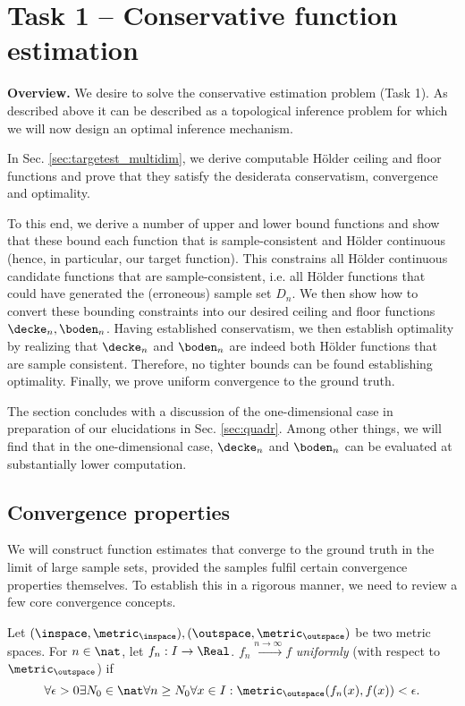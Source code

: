 
\section{Task 1 -- Conservative function estimation }
\label{sec:Hfe}
\textbf{Overview.} We desire to solve the conservative estimation problem (Task 1). As described above it can be described as a topological inference problem for which we will now design an optimal inference mechanism.  

In Sec. \ref{sec:targetest_multidim}, we derive computable H\"older ceiling and floor functions and prove that they satisfy the desiderata conservatism, convergence and optimality.  

To this end, we derive a number of upper and lower bound functions and show that these bound each function that is sample-consistent and H\"older continuous (hence, in particular, our target function). This constrains all H\"older continuous candidate functions that are sample-consistent, i.e. all H\"older functions that could have generated the (erroneous) sample set $D_n$. We then show how to convert these bounding constraints into our desired ceiling and floor functions $\decke_n, \boden_n$. Having established conservatism, we then establish optimality by realizing that $\decke_n$ and $\boden_n$ are indeed both H\"older functions that are sample consistent. Therefore, no tighter bounds can be found establishing optimality. Finally, we prove uniform convergence to the ground truth.

The section concludes with a discussion of the one-dimensional case in preparation of our elucidations in Sec. \ref{sec:quadr}. Among other things, we will find that in the one-dimensional case, $\decke_n$ and $\boden_n$ can be evaluated at substantially lower computation.\\

\subsection{Convergence properties}
We will construct function estimates that converge to the ground truth in the limit of large sample sets, provided the samples fulfil certain convergence properties themselves. To establish this in a rigorous manner, we need to review a few core convergence concepts. 
\begin{defn} Let $(\inspace, \metric_\inspace), (\outspace,\metric_\outspace)$ be two metric spaces.
For $n \in \nat$, let $f_n : I \to \Real$. $f_n \stackrel{n \to \infty}{\longrightarrow} f$ \emph{uniformly} (with respect to $\metric_\outspace$) if
\[  \forall \epsilon >0  \exists N_0 \in \nat \forall n\geq N_0 \forall x \in I: \metric_\outspace(f_n(x), f(x)) < \epsilon. \] 
\end{defn}

